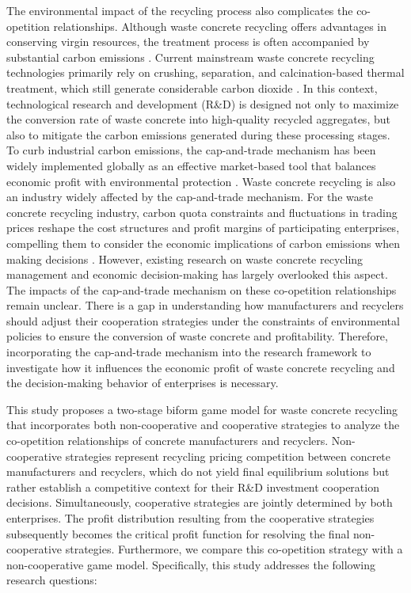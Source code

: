 \documentclass[authoryear,preprint,review,times,10pt]{elsarticle}
\begin{document}
The environmental impact of the recycling process also complicates the co-opetition relationships. Although waste concrete recycling offers advantages in conserving virgin resources, the treatment process is often accompanied by substantial carbon emissions \citep{difilippo2019Impacts}. Current mainstream waste concrete recycling technologies primarily rely on crushing, separation, and calcination-based thermal treatment, which still generate considerable carbon dioxide \citep{oh2021Proposal}. In this context, technological research and development (R\&D) is designed not only to maximize the conversion rate of waste concrete into high-quality recycled aggregates, but also to mitigate the carbon emissions generated during these processing stages.
To curb industrial carbon emissions, the cap-and-trade mechanism has been widely implemented globally as an effective market-based tool that balances economic profit with environmental protection \citep{oh2021Proposal,yenipazarli2019Incentives}. Waste concrete recycling is also an industry widely affected by the cap-and-trade mechanism.
For the waste concrete recycling industry, carbon quota constraints and fluctuations in trading prices reshape the cost structures and profit margins of participating enterprises, compelling them to consider the economic implications of carbon emissions when making decisions \citep{zheng2025Coopetition}. However, existing research on waste concrete recycling management and economic decision-making has largely overlooked this aspect. The impacts of the cap-and-trade mechanism on these co-opetition relationships remain unclear.
There is a gap in understanding how manufacturers and recyclers should adjust their cooperation strategies under the constraints of environmental policies to ensure the conversion of waste concrete and profitability. Therefore, incorporating the cap-and-trade mechanism into the research framework to investigate how it influences the economic profit of waste concrete recycling and the decision-making behavior of enterprises is necessary.

This study proposes a two-stage biform game model for waste concrete recycling that incorporates both non-cooperative and cooperative strategies to analyze the co-opetition relationships of concrete manufacturers and recyclers. Non-cooperative strategies represent recycling pricing competition between concrete manufacturers and recyclers, which do not yield final equilibrium solutions but rather establish a competitive context for their R\&D investment cooperation decisions. Simultaneously, cooperative strategies are jointly determined by both enterprises. The profit distribution resulting from the cooperative strategies subsequently becomes the critical profit function for resolving the final non-cooperative strategies. Furthermore, we compare this co-opetition strategy with a non-cooperative game model. Specifically, this study addresses the following research questions:
\end{document}
